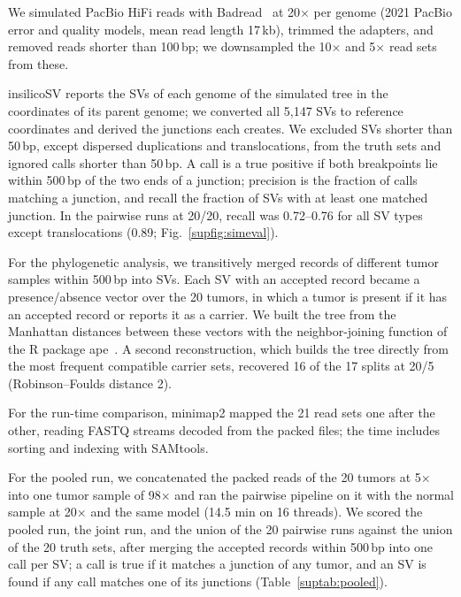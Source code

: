 We simulated PacBio HiFi reads with Badread~\cite{badread} at 20$\times$ per genome (2021 PacBio error and quality models, mean read length 17\,kb), trimmed the adapters, and removed reads shorter than 100\,bp; we downsampled the 10$\times$ and 5$\times$ read sets from these.


insilicoSV reports the SVs of each genome of the simulated tree in the coordinates of its parent genome; we converted all 5,147 SVs to reference coordinates and derived the junctions each creates.
We excluded SVs shorter than 50\,bp, except dispersed duplications and translocations, from the truth sets and ignored calls shorter than 50\,bp.
A call is a true positive if both breakpoints lie within 500\,bp of the two ends of a junction; precision is the fraction of calls matching a junction, and recall the fraction of SVs with at least one matched junction.
In the pairwise runs at 20/20, recall was 0.72--0.76 for all SV types except translocations (0.89; Fig.~\ref{supfig:simeval}).

For the phylogenetic analysis, we transitively merged records of different tumor samples within 500\,bp into SVs.
Each SV with an accepted record became a presence/absence vector over the 20 tumors, in which a tumor is present if it has an accepted record or \tool{} reports it as a carrier.
We built the tree from the Manhattan distances between these vectors with the neighbor-joining function of the R package ape~\cite{ape}.
A second reconstruction, which builds the tree directly from the most frequent compatible carrier sets, recovered 16 of the 17 splits at 20/5 (Robinson--Foulds distance 2).

For the run-time comparison, minimap2 mapped the 21 read sets one after the other, reading FASTQ streams decoded from the packed files; the time includes sorting and indexing with SAMtools.

For the pooled run, we concatenated the packed reads of the 20 tumors at 5$\times$ into one tumor sample of 98$\times$ and ran the pairwise pipeline on it with the normal sample at 20$\times$ and the same model (14.5 min on 16 threads).
We scored the pooled run, the joint run, and the union of the 20 pairwise runs against the union of the 20 truth sets, after merging the accepted records within 500\,bp into one call per SV; a call is true if it matches a junction of any tumor, and an SV is found if any call matches one of its junctions (Table~\ref{suptab:pooled}).

